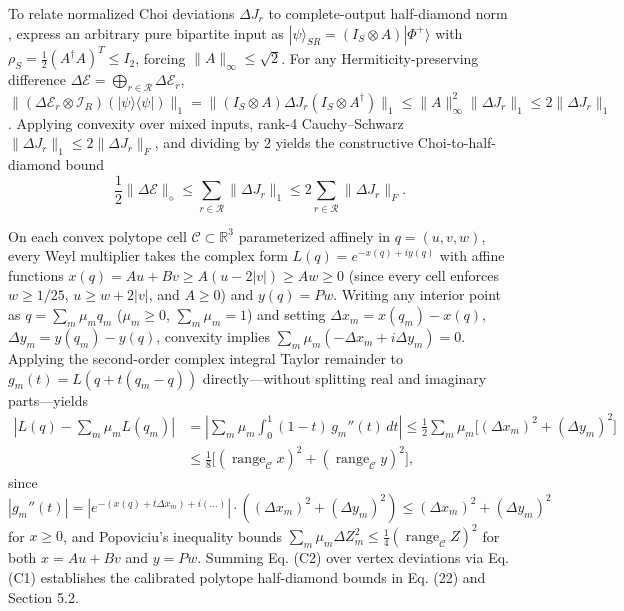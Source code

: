\documentclass[11pt,letterpaper]{article}
\theoremstyle{definition}
\begin{document}
To relate normalized Choi deviations \(\Delta J_r\) to complete-output
half-diamond norm \citep{watrous2018}, express an arbitrary pure
bipartite input as \(|\psi\rangle_{SR} = (I_S \otimes A)|\Phi^+\rangle\)
with \(\rho_S = \frac{1}{2}(A^\dagger A)^T \le I_2\), forcing
\(\|A\|_\infty \le \sqrt{2}\). For any Hermiticity-preserving difference
\(\Delta\mathcal{E} = \bigoplus_{r\in\mathcal{R}}\Delta\mathcal{E}_r\),
\(\|(\Delta\mathcal{E}_r \otimes \mathcal{I}_R)(|\psi\rangle\langle\psi|)\|_1 = \|(I_S \otimes A)\Delta J_r(I_S \otimes A^\dagger)\|_1 \le \|A\|_\infty^2 \|\Delta J_r\|_1 \le 2\|\Delta J_r\|_1\).
Applying convexity over mixed inputs, rank-4 Cauchy--Schwarz
\(\|\Delta J_r\|_1 \le 2\|\Delta J_r\|_F\), and dividing by \(2\) yields
the constructive Choi-to-half-diamond bound
\[\frac{1}{2}\|\Delta\mathcal{E}\|_\diamond \le \sum_{r\in\mathcal{R}} \|\Delta J_r\|_1 \le 2\sum_{r\in\mathcal{R}} \|\Delta J_r\|_F.
\tag{C1}\]

On each convex polytope cell \(\mathcal{C} \subset \mathbb{R}^3\)
parameterized affinely in \(q = (u, v, w)\), every Weyl multiplier takes
the complex form \(L(q) = e^{-x(q) + iy(q)}\) with affine functions
\(x(q) = Au + Bv \ge A(u - 2|v|) \ge Aw \ge 0\) (since every cell
enforces \(w \ge 1/25\), \(u \ge w + 2|v|\), and \(A \ge 0\)) and
\(y(q) = Pw\). Writing any interior point as \(q = \sum_m \mu_m q_m\)
(\(\mu_m \ge 0\), \(\sum_m \mu_m = 1\)) and setting
\(\Delta x_m = x(q_m) - x(q)\), \(\Delta y_m = y(q_m) - y(q)\),
convexity implies \(\sum_m \mu_m (-\Delta x_m + i\Delta y_m) = 0\).
Applying the second-order complex integral Taylor remainder to
\(g_m(t) = L(q + t(q_m - q))\) directly---without splitting real and
imaginary parts---yields \[\begin{aligned}
\left|L(q) - \sum_m \mu_m L(q_m)\right| &= \left|\sum_m \mu_m \int_0^1 (1 - t)\,g_m''(t)\,dt\right| \le \frac{1}{2}\sum_m \mu_m \Big[(\Delta x_m)^2 + (\Delta y_m)^2\Big] \\
&\le \frac{1}{8}\Big[(\operatorname{range}_{\mathcal{C}} x)^2 + (\operatorname{range}_{\mathcal{C}} y)^2\Big],
\end{aligned}
\tag{C2}\] since
\(|g_m''(t)| = |e^{-(x(q) + t\Delta x_m) + i(\dots)}|\cdot((\Delta x_m)^2 + (\Delta y_m)^2) \le (\Delta x_m)^2 + (\Delta y_m)^2\)
for \(x \ge 0\), and Popoviciu's inequality bounds
\(\sum_m \mu_m \Delta Z_m^2 \le \frac{1}{4}(\operatorname{range}_{\mathcal{C}} Z)^2\)
for both \(x = Au + Bv\) and \(y = Pw\). Summing Eq. (C2) over vertex
deviations via Eq. (C1) establishes the calibrated polytope half-diamond
bounds in Eq. (22) and Section 5.2.
\end{document}
